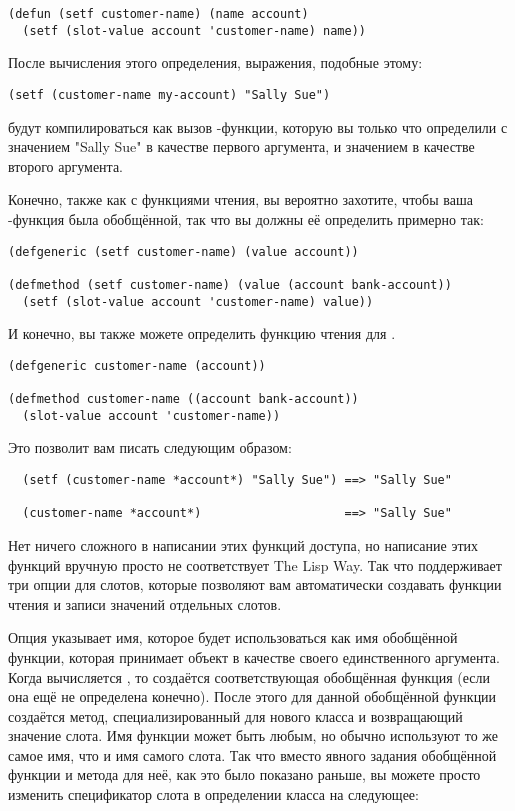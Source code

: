 \begin{lstlisting}
(defun (setf customer-name) (name account)
  (setf (slot-value account 'customer-name) name))
\end{lstlisting}

После вычисления этого определения, выражения, подобные этому:

\begin{lstlisting}
(setf (customer-name my-account) "Sally Sue")
\end{lstlisting}

будут компилироваться как вызов -функции, которую вы только что определили с
значением "Sally Sue" в качестве первого аргумента, и значением  в
качестве второго аргумента.

Конечно, также как с функциями чтения, вы вероятно захотите, чтобы ваша
-функция была обобщённой, так что вы должны её определить примерно так:

\begin{lstlisting}
(defgeneric (setf customer-name) (value account))

(defmethod (setf customer-name) (value (account bank-account))
  (setf (slot-value account 'customer-name) value))
\end{lstlisting}

И конечно, вы также можете определить функцию чтения для .

\begin{lstlisting}
(defgeneric customer-name (account))

(defmethod customer-name ((account bank-account))
  (slot-value account 'customer-name))
\end{lstlisting}

Это позволит вам писать следующим образом:

\begin{verbatim}
  (setf (customer-name *account*) "Sally Sue") ==> "Sally Sue"

  (customer-name *account*)                    ==> "Sally Sue"
\end{verbatim}

Нет ничего сложного в написании этих функций доступа, но написание этих функций вручную
просто не соответствует The Lisp Way.  Так что  поддерживает три опции для
слотов, которые позволяют вам автоматически создавать функции чтения и записи значений
отдельных слотов.

Опция  указывает имя, которое будет использоваться как имя обобщённой
функции, которая принимает объект в качестве своего единственного аргумента.  Когда
вычисляется , то создаётся соответствующая обобщённая функция (если она ещё
не определена конечно).  После этого для данной обобщённой функции создаётся метод,
специализированный для нового класса и возвращающий значение слота.  Имя функции может
быть любым, но обычно используют то же самое имя, что и имя самого слота.  Так что вместо
явного задания обобщённой функции  и метода для неё, как это было показано
раньше, вы можете просто изменить спецификатор слота  в определении класса
 на следующее:

